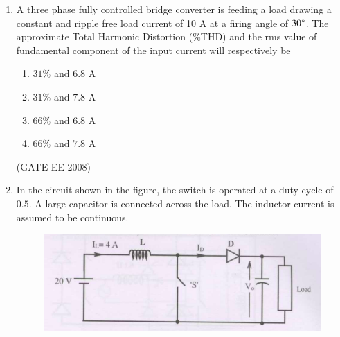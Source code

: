 \documentclass[journal,12pt,onecolumn]{IEEEtran}
\theoremstyle{remark}
\begin{document}
\begin{enumerate}[start=1, label=Q.\arabic*]
Assume that the load inductance is sufficient to ensure continuous and ripple free load current. The firing angle of the bridge for a load current of $I_o = 10$ A will be

\begin{multicols}{4}
\begin{enumerate}[label=(\Alph*)]
    \item $44\degree$
    \item $51\degree$
    \item $129\degree$
    \item $136\degree$
\end{enumerate}
\end{multicols}
\hfill (GATE EE 2008)



\item A three phase fully controlled bridge converter is feeding a load drawing a constant and ripple free load current of 10 A at a firing angle of $30\degree$. The approximate Total Harmonic Distortion (\%THD) and the rms value of fundamental component of the input current will respectively be

\begin{multicols}{4}
\begin{enumerate}[label=(\Alph*)]
    \item $31\%$ and $6.8$ A
    \item $31\%$ and $7.8$ A
    \item $66\%$ and $6.8$ A
    \item $66\%$ and $7.8$ A
\end{enumerate}
\end{multicols}
\hfill (GATE EE 2008)


\item In the circuit shown in the figure, the switch is operated at a duty cycle of $0.5$. A large capacitor is connected across the load. The inductor current is assumed to be continuous.

\begin{figure}[H]
    \centering
    \includegraphics[width=\columnwidth]{Fig/q64.png}
\end{figure}


\end{enumerate}
\end{document}
